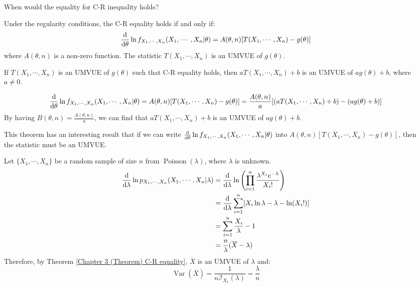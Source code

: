 \documentclass{huhtakm-template-book-v2}
\DeclareMathOperator{\Var}{Var}
\DeclareMathOperator{\Poisson}{Poisson}
\begin{document}
\newpage
When would the equality for C-R inequality holds?
\begin{thm}
	\label{Chapter 3 (Theorem) C-R equality}
	Under the regularity conditions, the C-R equality holds if and only if:
	\begin{equation*}
		\odv*{\ln{f_{X_{1},\cdots,X_{n}}(X_{1},\cdots,X_{n}|\theta)}}{\theta}=A(\theta,n)[T(X_{1},\cdots,X_{n})-g(\theta)]
	\end{equation*}
	where $A(\theta,n)$ is a non-zero function. The statistic $T(X_{1},\cdots,X_{n})$ is an UMVUE of $g(\theta)$. 
\end{thm}
\begin{lem}
	If $T(X_{1},\cdots,X_{n})$ is an UMVUE of $g(\theta)$ such that C-R equality holds, then $aT(X_{1},\cdots,X_{n})+b$ is an UMVUE of $ag(\theta)+b$, where $a\neq 0$.
\end{lem}
\begin{proofing}
	\begin{equation*}
		\odv*{\ln{f_{X_{1},\cdots,X_{n}}(X_{1},\cdots,X_{n}|\theta)}}{\theta}=A(\theta,n)[T(X_{1},\cdots,X_{n})-g(\theta)]=\frac{A(\theta,n)}{a}[(aT(X_{1},\cdots,X_{n})+b)-(ag(\theta)+b)]
	\end{equation*}
	By having $B(\theta,n)=\frac{A(\theta,n)}{a}$, we can find that $aT(X_{1},\cdots,X_{n})+b$ is an UMVUE of $ag(\theta)+b$.
\end{proofing}
This theorem has an interesting result that if we can write $\odv*{\ln{f_{X_{1},\cdots,X_{n}}(X_{1},\cdots,X_{n}|\theta)}}{\theta}$ into $A(\theta,n)[T(X_{1},\cdots,X_{n})-g(\theta)]$, then the statistic must be an UMVUE.
\begin{eg}
	Let $\{X_{1},\cdots,X_{n}\}$ be a random sample of size $n$ from $\Poisson(\lambda)$, where $\lambda$ is unknown.
	\begin{align*}
		\odv*{\ln{p_{X_{1},\cdots,X_{n}}(X_{1},\cdots,X_{n}|\lambda)}}{\lambda}&=\odv*{\ln\left(\prod_{i=1}^{n}\frac{\lambda^{X_{i}}e^{-\lambda}}{X_{i}!}\right)}{\lambda}\\
		&=\odv*{\sum_{i=1}^{n}[X_{i}\ln{\lambda}-\lambda-\ln(X_{i}!)]}{\lambda}\\
		&=\sum_{i=1}^{n}\frac{X_{i}}{\lambda}-1\\
		&=\frac{n}{\lambda}(\overline{X}-\lambda)
	\end{align*}
	Therefore, by Theorem \ref{Chapter 3 (Theorem) C-R equality}, $\overline{X}$ is an UMVUE of $\lambda$ and:
	\begin{equation*}
		\Var(\overline{X})=\frac{1}{n\mathcal{I}_{X_{1}}(\lambda)}=\frac{\lambda}{n}
	\end{equation*}
\end{eg}
\end{document}
